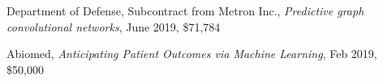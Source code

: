 \documentclass[margin,line]{res}
\begin{document}
\begin{resume}
\begin{enumerate}[label={[G\arabic*]}]
\item  Department of Defense, Subcontract from Metron Inc., \textit{Predictive graph convolutional networks}, June 2019, \$71,784 	
 
 \item Abiomed, \textit{Anticipating Patient Outcomes via Machine Learning}, Feb 2019, \$50,000 

%
%
 \end{enumerate}



%
%
%
%
%
%
%
%
%
%
%
%
%
%
%
%
%
%
%
%
%
%
%
%
%
%
%
%
%
% 
% 
% 
% 
% 



\end{resume}
\end{document}
